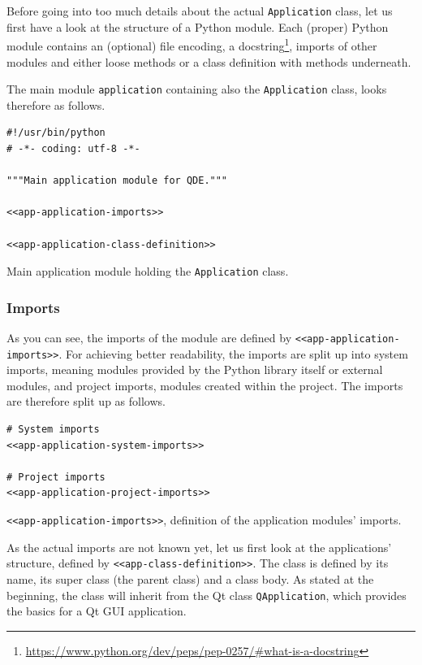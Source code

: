 \documentclass[10pt, openright, notitlepage]{scrreprt}
\begin{document}
Before going into too much details about the actual \texttt{Application} class, let us
first have a look at the structure of a Python module. Each (proper) Python
module contains an (optional) file encoding, a
docstring\footnote{\url{https://www.python.org/dev/peps/pep-0257/\#what-is-a-docstring}},
imports of other modules and either loose methods or a class definition with
methods underneath.

The main module \texttt{application} containing also the \texttt{Application} class, looks
therefore as follows.

\begin{listing}[H]
\begin{verbatim}
#!/usr/bin/python
# -*- coding: utf-8 -*-

"""Main application module for QDE."""

<<app-application-imports>>

<<app-application-class-definition>>
\end{verbatim}
\caption{Main application module holding the \texttt{Application} class.}
\end{listing}

\subsubsection{Imports}
\label{sec:org73aec0e}
As you can see, the imports of the module are defined by \texttt{<<app-application-imports>>}. For
achieving better readability, the imports are split up into system imports,
meaning modules provided by the Python library itself or external modules, and
project imports, modules created within the project. The imports are therefore
split up as follows.

\begin{listing}[H]
\begin{verbatim}
# System imports
<<app-application-system-imports>>

# Project imports
<<app-application-project-imports>>
\end{verbatim}
\caption{\label{app-application-imports}
\texttt{<<app-application-imports>>}, definition of the application modules' imports.}
\end{listing}

As the actual imports are not known yet, let us first look at the applications'
structure, defined by \texttt{<<app-class-definition>>}. The class is defined by its
name, its super class (the parent class) and a class body. As stated at the
beginning, the class will inherit from the Qt class \texttt{QApplication}, which
provides the basics for a Qt GUI application.
\end{document}
